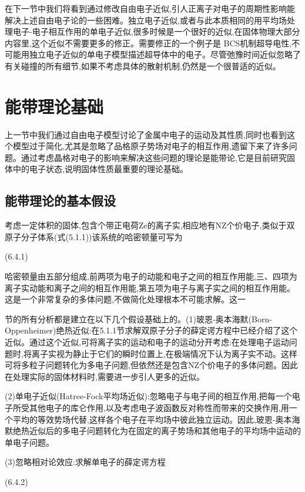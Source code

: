 在下一节中我们将看到通过修改自由电子近似,引人正离子对电子的周期性影响能解决上述自由电子论的一些困难。独立电子近似,或者与此本质相同的用平均场处理电子-电子相互作用的单电子近似,很多时候是一个很好的近似,在固体物理大部分内容里,这个近似不需要更多的修正。需要修正的一个例子是 BCS机制超导电性,不可能用独立电子近似的单电子模型描述超导体中的电子。尽管弛豫时间近似忽略了有关碰撞的所有细节,如果不考虑具体的散射机制,仍然是一个很普适的近似。

\section{能带理论基础}

上一节中我们通过自由电子模型讨论了金属中电子的运动及其性质,同时也看到这个模型过于简化,尤其是忽略了品格原子势场对电子的相互作用,遗留下来了许多问题。通过考虑晶格对电子的影响来解决这些问题的理论是能带论,它是目前研究固体中的电子状态,说明固体性质最重要的理论基础。

\subsection{能带理论的基本假设}

考虑一定体积的固体,包含个带正电荷Ze的离子实,相应地有NZ个价电子,类似于双原子分子体系(式(5.1.1))该系统的哈密顿量可写为

 	(6.4.1)

哈密顿量由五部分组成,前两项为电子的动能和电子之间的相互作用能,三、四项为离子实动能和离子之间的相互作用能,第五项为电子与离子实之间的相互作用能。这是一个非常复杂的多体问题,不做简化处理根本不可能求解。这一

节的所有分析都是建立在以下几个假设基础上的。(1)玻恩-奥本海默(Born-Oppenheimer)绝热近似:在5.1.1节求解双原子分子的薛定谔方程中已经介绍了这个近似。通过这个近似,可将离子实的运动和电子的运动分开考虑:在处理电子运动问题时,将离子实视为静止于它们的瞬时位置上,在极端情况下认为离子实不动。这样可将多粒子问题转化为多电子问题,但依然还是包含NZ个价电子的多体问题。因此在处理实际的固体材料时,需要进一步引人更多的近似。

(2)单电子近似(Hatree-Fock平均场近似):忽略电子与电子间的相互作用,把每一个电子所受其他电子的库仑作用,以及考虑电子波函数反对称性而带来的交换作用,用一个平均的等效势场代替,这样各个电子在平均场中彼此独立运动。因此,玻恩-奥本海默绝热近似后的多电子问题转化为在固定的离子势场和其他电子的平均场中运动的单电子问题。

(3)忽略相对论效应:求解单电子的薛定谔方程

 	(6.4.2)

